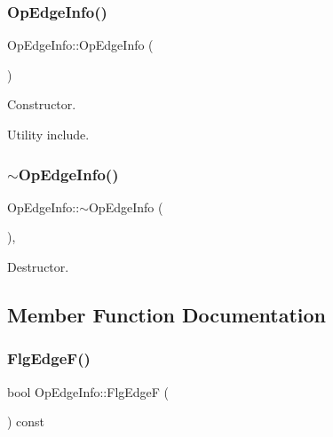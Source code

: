 \subsubsection{\texorpdfstring{Op\+Edge\+Info()}{OpEdgeInfo()}}
{\footnotesize\ttfamily Op\+Edge\+Info\+::\+Op\+Edge\+Info (\begin{DoxyParamCaption}{ }\end{DoxyParamCaption})\hspace{0.3cm}{\ttfamily [default]}}



Constructor. 

Utility include. \mbox{\label{classOpEdgeInfo_ae9059c1e2b4b9f09b01ddfbb34e9bbfc}} 
\subsubsection{\texorpdfstring{$\sim$\+Op\+Edge\+Info()}{~OpEdgeInfo()}}
{\footnotesize\ttfamily Op\+Edge\+Info\+::$\sim$\+Op\+Edge\+Info (\begin{DoxyParamCaption}{ }\end{DoxyParamCaption})\hspace{0.3cm}{\ttfamily [override]}, {\ttfamily [default]}}



Destructor. 



\subsection{Member Function Documentation}
\mbox{\label{classOpEdgeInfo_abf631c945933fea3024f3c506178fca7}} 
\subsubsection{\texorpdfstring{Flg\+Edge\+F()}{FlgEdgeF()}}
{\footnotesize\ttfamily bool Op\+Edge\+Info\+::\+Flg\+EdgeF (\begin{DoxyParamCaption}{ }\end{DoxyParamCaption}) const}



